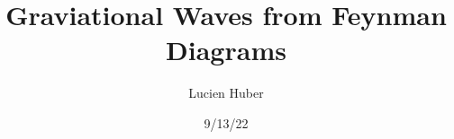 \documentclass[
  10pt,
  a4paper,
  DIV=11,
  numbers=noendperiod,
  oneside]{scrreprt}
\title{Graviational Waves from Feynman Diagrams}
\author{Lucien Huber}
\date{9/13/22}
\DeclareRobustCommand{\[}{\begin{equation}}
\DeclareRobustCommand{\]}{\end{equation}}
\begin{document}
\maketitle
\usetikzlibrary{decorations.markings,graphs,decorations.pathmorphing,graphdrawing,quotes,arrows.meta}



\newcommand{\half}[1][1]{\tfrac{#1}{2}}
\newcommand{\Half}[1][1]{\frac{#1}{2}}
\newcommand{\pa}[2][]{#1(#2 #1)}
\newcommand{\bc}[2][]{#1[#2 #1]}
\newcommand{\brc}{\bc}
\newcommand{\bk}[2][]{#1\{#2 #1\}}
\newcommand{\brk}{\bk}
\newcommand{\ang}[2][]{#1\langle #2 #1\rangle}
\newcommand{\abs}[2][]{#1\vert#2 #1\vert}
\newcommand{\norm}[2][]{#1\Vert#2 #1\Vert}
\newcommand{\order}[2][]{\mathcal{O}(#2^{#1})}


\newcommand{\partialder}[1][]{\partial_{#1}}
\newcommand{\differential}{\mathrm{d}}
\newcommand{\Diff}{\mathrm{D}}


\newcommand{\pdv}[3][]{\frac{\partialder^{#1} #2}{\partialder {#3}^{#1}}} 
\newcommand{\odv}[3][]{\frac{\differential^{#1} #2}{\differential {#3}^{#1}}}
\newcommand{\mdv}[3][]{\frac{\Diff^{#1} #2}{\Diff {#3}^{#1}}}
\newcommand{\fdv}[3][]{\frac{\delta^{#1} #2}{\delta {#3}^{#1}}}
\newcommand{\jdv}[3][]{\frac{\partialder ^{#1}(#2)}{\partialder ({#3})^{#1}}}
\newcommand{\adv}[3][]{\frac{\Delta^{#1} #2}{\Delta {#3}^{#1}}}

\newcommand{\dd}[2][]{\,\differential^{#1}#2\,}

\newcommand{\euler}{e}
\let\oldexp\exp
\newcommand{\Exp}[2][]{\oldexp#1({#2}#1)}
\renewcommand{\exp}[1]{\mathrm{\euler}^{#1}}
\let\oldln\ln
\renewcommand{\ln}[2][]{\oldln#1({#2}#1)}

\newcommand{\greens}[2][ret]{\mathcal{G}_{\mathrm{#1}}(#2)}
\newcommand{\thetafn}[2][]{\Theta^{{#1}}(#2)}
\newcommand{\deltafn}[2][]{\delta^{{#1}}(#2)}


\newcommand{\iunit}{\mathring{\imath}}
\newcommand{\im}{\iunit}

\newcommand{\tv}[2][]{\mathbf{{#2}}_{#1}}
\newcommand{\lv}[2][]{{#2}_{#1}}


\newcommand{\scf}[1][]{\phi_{#1}}
\newcommand{\ascf}[1][]{\adj{\phi}_{#1}}

\newcommand{\bra}[2][]{{}_{\text{#1}}\langle #2 \vert}


\newcommand{\ket}[2][]{\vert #2 \rangle_{\text{#1}}}

\newcommand{\obs}[1]{#1}

\newcommand{\op}[1]{\mathbb{#1}}
\end{document}
